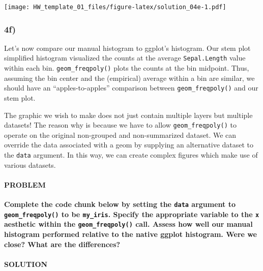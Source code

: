 \documentclass[]{article}
\let\oldparagraph\paragraph
\renewcommand{\paragraph}[1]{\oldparagraph{#1}\mbox{}}
\begin{document}
\texttt{[image: HW\_template\_01\_files/figure-latex/solution\_04e-1.pdf]}

\hypertarget{f-1}{%
\subsubsection{4f)}\label{f-1}}

Let's now compare our manual histogram to ggplot's histogram. Our stem
plot simplified histogram visualized the counts at the average
\texttt{Sepal.Length} value within each bin. \texttt{geom\_freqpoly()}
plots the counts at the bin midpoint. Thus, assuming the bin center and
the (empirical) average within a bin are similar, we should have an
``apples-to-apples'' comparison between \texttt{geom\_freqpoly()} and
our stem plot.

The graphic we wish to make does not just contain multiple layers but
multiple datasets! The reason why is because we have to allow
\texttt{geom\_freqpoly()} to operate on the original non-grouped and
non-summarized dataset. We can override the data associated with a geom
by supplying an alternative dataset to the \texttt{data} argument. In
this way, we can create complex figures which make use of various
datasets.

\hypertarget{problem-23}{%
\paragraph{PROBLEM}\label{problem-23}}

\textbf{Complete the code chunk below by setting the \texttt{data}
argument to \texttt{geom\_freqpoly()} to be \texttt{my\_iris}. Specify
the appropriate variable to the \texttt{x} aesthetic within the
\texttt{geom\_freqpoly()} call. Assess how well our manual histogram
performed relative to the native ggplot histogram. Were we close? What
are the differences?}

\hypertarget{solution-22}{%
\paragraph{SOLUTION}\label{solution-22}}
\end{document}

